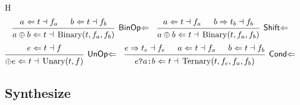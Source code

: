 \documentclass{article}
\DeclareMathOperator{\Binary}{Binary}
\DeclareMathOperator{\Unary}{Unary}
\DeclareMathOperator{\Ternary}{Ternary}
\newcommand{\Syn}{\ensuremath{\Rightarrow}}
\newcommand{\Chk}{\ensuremath{\Leftarrow}}
\newcommand{\s}[3]{\ensuremath{#1 \Syn{} #2 \dashv{} #3}}
\renewcommand{\c}[3]{\ensuremath{#1 \Chk{} #2 \dashv{} #3}}
\begin{document}
H
\begin{align*}
   &
  \begin{prooftree}
    \hypo{\c{a}{t}{f_a}}
    \hypo{\c{b}{t}{f_b}}
    \infer2[\textsf{BinOp\Chk}]{\c{a\oplus b}{t}{\Binary(t, f_a, f_b)}}
  \end{prooftree}
   &
   &
  \begin{prooftree}
    \hypo{\c{a}{t}{f_a}}
    \hypo{\s{b}{t_b}{f_b}}
    \infer2[\textsf{Shift\Chk}]{\c{a \oplus b}{t}{\Binary(t, f_a, f_b)}}
  \end{prooftree}
\end{align*}
\begin{align*}
   &
  \begin{prooftree}
    \hypo{\c{e}{t}{f}}
    \infer1[\textsf{UnOp\Chk}]{\c{\oplus e}{t}{\Unary(t, f)}}
  \end{prooftree}
   &
   &
  \begin{prooftree}
    \hypo{\s{e}{t_e}{f_e}}
    \hypo{\c{a}{t}{f_a}}
    \hypo{\c{b}{t}{f_b}}
    \infer3[\textsf{Cond\Chk}]{\c{e \texttt{?} a \texttt{:} b}{t}%
      {\Ternary(t, f_e, f_a, f_b)}}
  \end{prooftree}
\end{align*}

\newpage
\subsection*{Synthesize}
\end{document}
